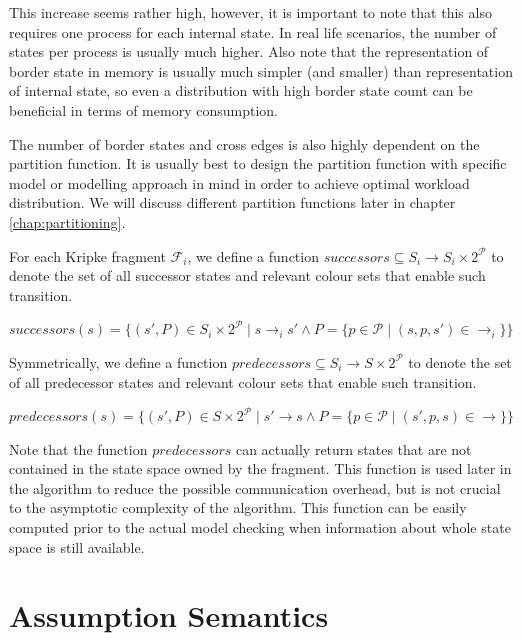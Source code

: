 \documentclass[12pt,oneside]{fithesis2}
\newcommand{\kf}[2]{\ensuremath{\mathcal{F}^{#2}_{#1}}}
\newcommand{\trans}[1]{\stackrel{#1}{\rightarrow}}
\newcommand{\params}{\mathcal{P}}
\begin{document}
			This increase seems rather high, however, it is important to note that this also requires one process for each internal state. In real life scenarios, the number of states per process is usually much higher. Also note that the representation of border state in memory is usually much simpler (and smaller) than representation of internal state, so even a distribution with high border state count can be beneficial in terms of memory consumption. 								
			
			The number of border states and cross edges is also highly dependent on the partition function. It is usually best to design the partition function with specific model or modelling approach in mind in order to achieve optimal workload distribution. We will discuss different partition functions later in chapter \ref{chap:partitioning}. 
			
			For each Kripke fragment $\kf{i}{}$, we define a function $successors \subseteq S_{i} \rightarrow S_{i} \times 2^\params$ to denote the set of all successor states and relevant colour sets that enable such transition.
			
			\begin{center}
				$successors(s) = \{(s', P) \in S_{i} \times 2^\params \mid s \trans{}_{i} s' \wedge P = \{p \in \params \mid (s, p, s') \in \trans{}_i \}\} $
			\end{center}
			
			Symmetrically, we define a function $predecessors \subseteq S_{i} \rightarrow S \times 2^\params$ to denote the set of all predecessor states and relevant colour sets that enable such transition.
			
			\begin{center}
				$predecessors(s) = \{(s', P) \in S \times 2^\params \mid s' \trans{} s \wedge P = \{p \in \params \mid (s', p, s) \in \trans{} \}\} $
			\end{center}						
			
			Note that the function $predecessors$ can actually return states that are not contained in the state space owned by the fragment. This function is used later in the algorithm to reduce the possible communication overhead, but is not crucial to the asymptotic complexity of the algorithm. This function can be easily computed prior to the actual model checking when information about whole state space is still available.
			
		\section{Assumption Semantics}
		
\end{document}
